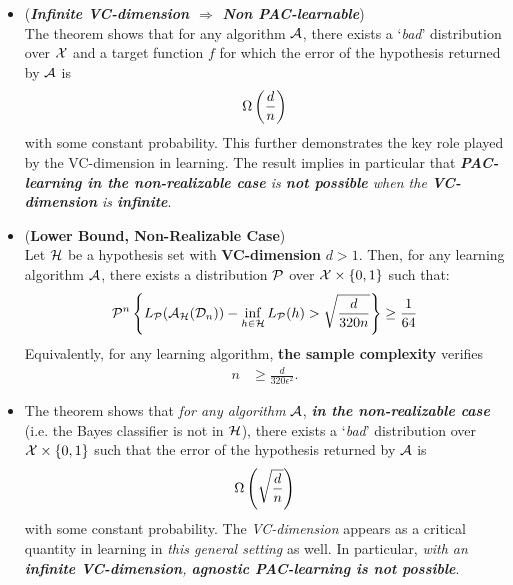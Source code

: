 \documentclass[11pt]{article}
\begin{document}
\begin{itemize}
\item \begin{remark} (\emph{\textbf{Infinite VC-dimension $\Rightarrow$ Non PAC-learnable}})\\
The theorem shows that for any algorithm ${\mathcal A}$, there exists a `\emph{bad}' distribution over ${\mathcal X}$ and a target function $f$ for which the error of the hypothesis returned by ${\mathcal A}$ is
\begin{align*}
\Omega\left(\frac{d}{n}\right)
\end{align*} with some constant probability. This further demonstrates the key role played by the VC-dimension in learning. The result implies in particular that \emph{\textbf{PAC-learning in the non-realizable case} is \textbf{not possible} when the \textbf{VC-dimension} is \textbf{infinite}}.
\end{remark}

\item \begin{proposition} (\textbf{Lower Bound, Non-Realizable Case}) \citep{mohri2018foundations} \\
Let ${\mathcal H}$ be a hypothesis set with \textbf{VC-dimension} $d > 1$. Then, for any learning algorithm ${\mathcal A}$, there exists a distribution ${\mathcal P}$ over ${\mathcal X} \times \left\{0, 1\right\}$ such that:
\begin{align*}
{\mathcal P}^{n}\left\{L_{{\mathcal P}}({\mathcal A}_{{\mathcal H}}({\mathcal D}_n)) - \inf_{h  \in {\mathcal H}}L_{{\mathcal P}}(h)  > \sqrt{\frac{d}{320 n}}\right\} \ge \frac{1}{64}
\end{align*} Equivalently, for any learning algorithm, \textbf{the sample complexity} verifies
\begin{align*}
n &\ge \frac{d}{320 \epsilon^2}.
\end{align*}
\end{proposition}

\item \begin{remark}
The theorem shows that \emph{for any algorithm} ${\mathcal A}$, \emph{\textbf{in the non-realizable case}} (i.e. the Bayes classifier is not in ${\mathcal H}$), there exists
a `\emph{bad}' distribution over ${\mathcal X} \times \left\{0, 1\right\}$ such that the error of the hypothesis returned by ${\mathcal A}$ is
\begin{align*}
\Omega\left(\sqrt{\frac{d}{n}}\right)
\end{align*} with some constant probability. The \emph{VC-dimension} appears as a critical quantity in learning in \emph{this general setting} as well. In particular, \emph{with an \textbf{infinite VC-dimension}, \textbf{agnostic PAC-learning is not possible}}.
\end{remark}
\end{itemize}


\newpage


\end{document}

